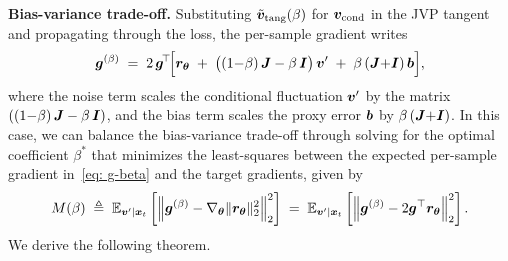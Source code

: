 \noindent\textbf{Bias-variance trade-off.} Substituting $\tilde{{\bm{v}}}_{\text{tang}}(\beta)$ for ${\bm{v}}_{\text{cond}}$ in the JVP tangent and propagating through the loss, the per-sample gradient writes
\begin{equation}
    {\bm{g}}^{(\beta)} \;=\; 2\,{\bm{g}}^{\!\top}\!\Bigl[{\bm{r}}_{{\bm{\theta}}} \;+\; \bigl((1{-}\beta)\,{\bm{J}} - \beta\,{\bm{I}}\bigr)\,{\bm{v}}^{\prime} \;+\; \beta\,({\bm{J}}{+}{\bm{I}})\,{\bm{b}}\Bigr],
    \label{eq: g-beta}
\end{equation}
where the noise term scales the conditional fluctuation ${\bm{v}}^{\prime}$ by the matrix $((1{-}\beta)\,{\bm{J}} - \beta\,{\bm{I}})$, and the bias term scales the proxy error ${\bm{b}}$ by $\beta\,({\bm{J}}{+}{\bm{I}})$. In this case, we can balance the bias-variance trade-off through solving for the optimal coefficient $\beta^{\ast}$ that minimizes the least-squares between the expected per-sample gradient in~\eqref{eq: g-beta} and the target gradients, given by
\begin{equation}
    M(\beta)\;\triangleq\;\mathbb{E}_{{\bm{v}}^{\prime}\mid{{\bm{x}}_{t}}}\left[\left\|{\bm{g}}^{(\beta)}-\nabla_{{\bm{\theta}}}\|{\bm{r}}_{{\bm{\theta}}}\|_{2}^{2}\right\|_{2}^{2}\right]\;=\;\mathbb{E}_{{\bm{v}}^{\prime}\mid{{\bm{x}}_{t}}}\left[\left\|{\bm{g}}^{(\beta)}-2{\bm{g}}^{\top}{\bm{r}}_{{\bm{\theta}}}\right\|_{2}^{2}\right].
    \label{eq: beta-target}
\end{equation}
We derive the following theorem.


